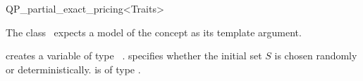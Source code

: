 \begin{ccRefClass}{QP_partial_exact_pricing<Traits>}

\ccInheritsFrom
{}

\ccRequirements
\ccIndexRequirements

The class \ccRefName\ expects a model of the concept
 as its template argument. 


\ccTypes \ccIndexClassTypes


\ccCreation
\ccIndexClassCreation
{}

{creates a variable of type \ccRefName\ .  specifies
whether the initial set $S$ is chosen randomly or deterministically.
 is of type .}


\ccUnchecked

\ccAccessFunctions
\begin{ccIndexMemberFunctions}




\ccModifiers
{}





\end{ccIndexMemberFunctions}

%
%
%
%


\end{ccRefClass}
